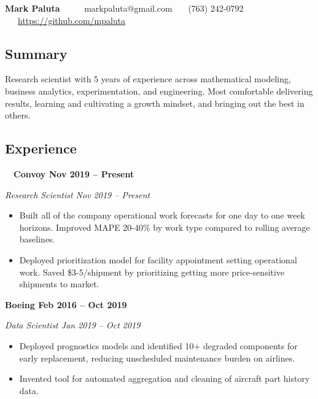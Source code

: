 \documentclass[10pt,letterpaper]{article}
\begin{document}
    \begin{center}
    {\LARGE \textbf{Mark Paluta}} \ \ \ \ \
    markpaluta@gmail.com \ \textbullet \ \ (763) 242-0792 \ \textbullet \ \ \href{https://github.com/mpaluta}{https://github.com/mpaluta}
    \end{center}

\subsection*{Summary}

    \begin{description}

    Research scientist with 5 years of experience across mathematical modeling, business analytics, experimentation, and engineering. Most comfortable delivering results, learning and cultivating a growth mindset, and bringing out the best in others.

    \end{description}

\subsection*{Experience}

    \quad \ \ \textbf{Convoy \hfill Nov 2019 – Present}

        \quad \emph{Research Scientist \hfill Nov 2019 – Present}

            \begin{itemize}[label={--}, leftmargin=.5in, labelindent=16pt, topsep=1pt]
                \setlength\itemsep{-.25em}
            	\item Built all of the company operational work forecasts for one day to one week horizons. Improved MAPE 20-40\% by work type compared to rolling average baselines.
            	\item Deployed prioritization model for facility appointment setting operational work. Saved \$3-5/shipment by prioritizing getting more price-sensitive shipments to market.
            \end{itemize}

    \textbf{Boeing \hfill Feb 2016 – Oct 2019}

        \quad \emph{Data Scientist \hfill Jan 2019 – Oct 2019}

            \begin{itemize}[label={--}, leftmargin=.5in, labelindent=16pt, topsep=1pt]
                \setlength\itemsep{-.25em}
            	\item Deployed prognostics models and identified 10+ degraded components for early replacement, reducing unscheduled maintenance burden on airlines.
            	\item Invented tool for automated aggregation and cleaning of aircraft part history data.
            \end{itemize}
\end{document}
